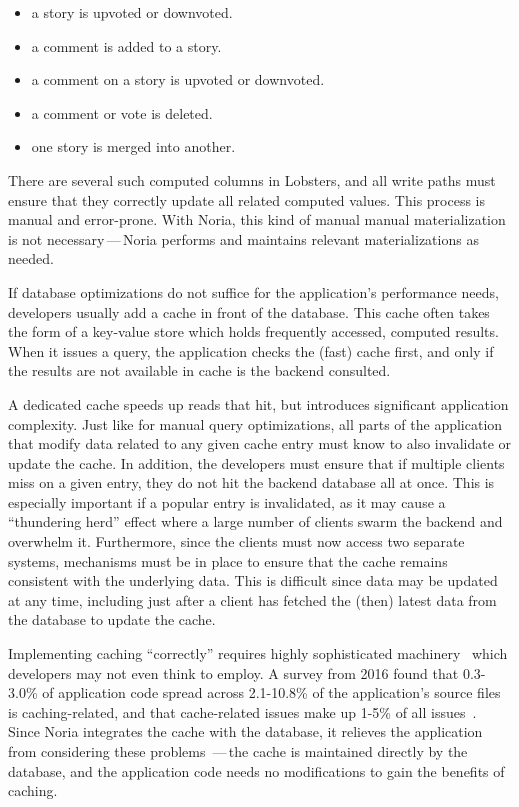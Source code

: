 \begin{itemize}
    \item a story is upvoted or downvoted.
    \item a comment is added to a story.
    \item a comment on a story is upvoted or downvoted.
    \item a comment or vote is deleted.
    \item one story is merged into another.
\end{itemize}

There are several such computed columns in Lobsters, and all write paths must
ensure that they correctly update all related computed values. This process is
manual and error-prone. With Noria, this kind of manual manual materialization
is not necessary\,---\,Noria performs and maintains relevant materializations as
needed.

If database optimizations do not suffice for the application's performance
needs, developers usually add a cache in front of the database. This cache
often takes the form of a key-value store which holds frequently accessed,
computed results. When it issues a query, the application checks the (fast)
cache first, and only if the results are not available in cache is the backend
consulted.

A dedicated cache speeds up reads that hit, but introduces significant
application complexity. Just like for manual query optimizations, all parts of
the application that modify data related to any given cache entry must know to
also invalidate or update the cache. In addition, the developers must ensure
that if multiple clients miss on a given entry, they do not hit the backend
database all at once. This is especially important if a popular entry is
invalidated, as it may cause a ``thundering herd'' effect where a large number
of clients swarm the backend and overwhelm it. Furthermore, since the clients
must now access two separate systems, mechanisms must be in place to ensure that
the cache remains consistent with the underlying data. This is difficult since
data may be updated at any time, including just after a client has fetched the
(then) latest data from the database to update the cache.

Implementing caching ``correctly'' requires highly sophisticated
machinery~\cite{facebook-memcache, transactional-cache, orm-cache, sql-cache}
which developers may not even think to employ. A survey from 2016 found that
0.3-3.0\% of application code spread across 2.1-10.8\% of the application's
source files is caching-related, and that cache-related issues make up 1-5\% of
all issues~\cite{caching-is-hard}. Since Noria integrates the cache with the
database, it relieves the application from considering these problems \,---\,the
cache is maintained directly by the database, and the application code needs no
modifications to gain the benefits of caching.

